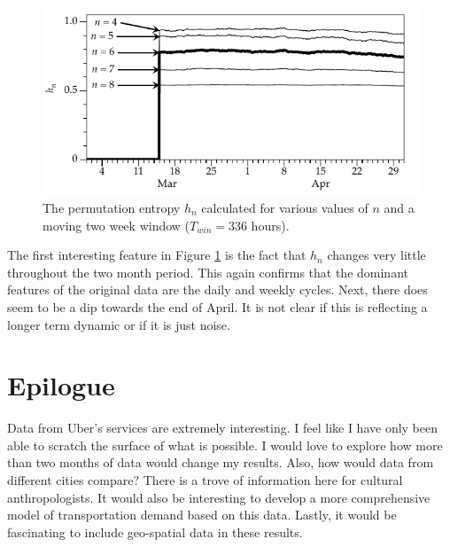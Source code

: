 \documentclass{tufte-handout}
\begin{document}
\begin{figure}[h]
	\includegraphics[width=\linewidth]{pe.pdf}%
	\caption{The permutation entropy $h_n$ calculated for various values of $n$ and a moving two week window ($T_{win} = 336$ hours). }%
	\label{fig:pe}%
\end{figure}

The first interesting feature in Figure \ref{fig:pe} is the fact that $h_n$ changes very little throughout the two month period. This again confirms that the dominant features of the original data are the daily and weekly cycles. Next, there does seem to be a dip towards the end of April. It is not clear if this is reflecting a longer term dynamic or if it is just noise.

\section{Epilogue}

Data from Uber's services are extremely interesting. I feel like I have only been able to scratch the surface of what is possible. I would love to explore how more than two months of data would change my results. Also, how would data from different cities compare? There is a trove of information here for cultural anthropologists. It would also be interesting to develop a more comprehensive model of transportation demand based on this data. Lastly, it would be fascinating to include geo-spatial data in these results.




\end{document}
